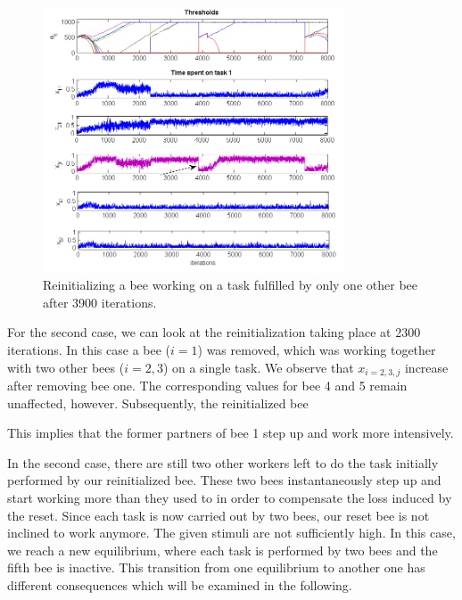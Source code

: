 \begin{figure}[ht!]
	\centering
	\includegraphics[width=0.8\textwidth]{figures/figure1}
	\caption{Reinitializing a bee working on a task fulfilled by only one other bee after 3900 iterations.}
	\label{fig:figure1}
\end{figure}

For the second case, we can look at the reinitialization taking place at 2300 iterations. In this case a bee ($i=1$) was removed, which was working together with two other bees ($i=2,3$) on a single task. We observe that $x_{i=2,3,j}$ increase after removing bee one. The corresponding values for bee 4 and 5 remain unaffected, however. Subsequently, the reinitialized bee

This implies that the former partners of bee 1 step up and work more intensively.

In the second case, there are still two other workers left to do the task initially performed by our reinitialized bee. These two bees instantaneously step up and start working more than they used to in order to compensate the loss induced by the reset. Since each task is now carried out by two bees, our reset bee is not inclined to work anymore. The given stimuli are not sufficiently high. In this case, we reach a new equilibrium, where each task is performed by two bees and the fifth bee is inactive. This transition from one equilibrium to another one has different consequences which will be examined in the following.

